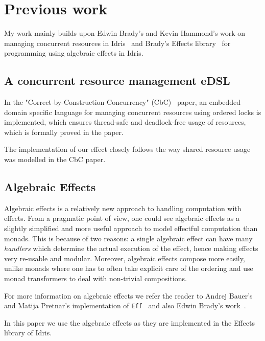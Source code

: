 \section{Previous work}

My work mainly builds upon Edwin Brady's and Kevin Hammond's work on managing
concurrent resources in Idris~\cite{cbconc-fi} and Brady's Effects
library~\cite{effects-idr} for programming using algebraic effects in Idris.

\subsection{A concurrent resource management eDSL}

In the "Correct-by-Construction Concurrency" (CbC)~\cite{cbconc-fi} paper, an
embedded domain specific language for managing concurrent resources using
ordered locks is implemented, which ensures thread-safe and deadlock-free usage
of resources, which is formally proved in the paper.

The implementation of our effect closely follows the way shared resource usage
was modelled in the CbC paper.

\subsection{Algebraic Effects}

Algebraic effects is a relatively new approach to handling computation with
effects. From a pragmatic point of view, one could see algebraic effects as a
slightly simplified and more useful approach to model effectful computation than
monads. This is because of two reasons: a single algebraic effect can have many
\emph{handlers} which determine the actual execution of the effect, hence
making effects very re-usable and modular. Moreover, algebraic effects compose
more easily, unlike monads where one has to often take explicit care of the
ordering and use monad transformers to deal with non-trivial compositions.

For more information on algebraic effects we refer the reader to Andrej Bauer's
and Matija Pretnar's implementation of \texttt{Eff}~\cite{eff} and also Edwin Brady's work~\cite{effects-idr}.

In this paper we use the algebraic effects as they are implemented in the
Effects library of Idris.
